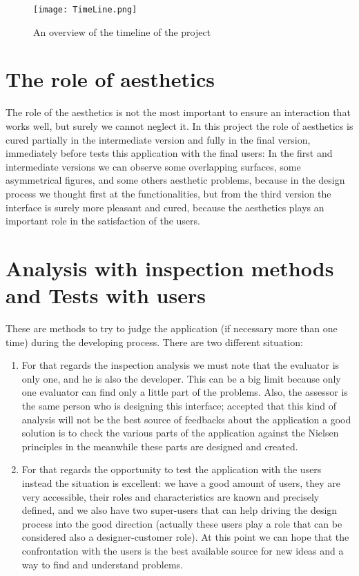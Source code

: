 \begin{figure}[H]
\centering
\texttt{[image: TimeLine.png]} 
\caption{An overview of the timeline of the project}
\end{figure}


\section{The role of aesthetics}
The role of the aesthetics is not the most important to ensure an interaction that works well, but surely we cannot neglect it. 
In this project the role of aesthetics is cured partially in the intermediate version and fully in the final version, immediately before tests this application with the final users:
In the first and intermediate versions we can observe some overlapping surfaces, some asymmetrical figures, and some others aesthetic problems, because in the design process we thought first at the functionalities, but from the third version the interface is surely more pleasant and cured, because the aesthetics plays an important role in the satisfaction of the users.  

\section{Analysis with inspection methods and Tests with users}
These are methods to try to judge the application (if necessary more than one time) during the developing process. There are two different situation:

\begin{enumerate}

\item For that regards the inspection analysis we must note that the evaluator is only one, and he is also the developer. This can be a big limit because only one evaluator can find only a little part of the problems. Also, the assessor is the same person who is designing this interface; accepted that this kind of analysis will not be the best source of feedbacks about the application a good solution is to check the various parts of the application against the Nielsen principles in the meanwhile these parts are designed and created.

\item For that regards the opportunity to test the application with the users instead the situation is excellent: we have a good amount of users, they are very accessible, their roles and characteristics are known and precisely defined, and we also have two super-users that can help driving the design process into the good direction (actually these users play a role that can be considered also a designer-customer role). At this point we can hope that the confrontation with the users is the best available source for new ideas and a way to find and understand problems.    

\end{enumerate}

